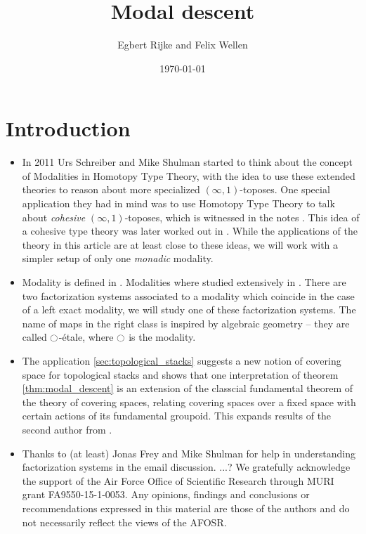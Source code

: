 \documentclass[9pt,twosided]{amsart}
\title{Modal descent}
\author{Egbert Rijke and Felix Wellen}
\date{\today}
\begin{document}
\maketitle

\section{Introduction}
\begin{itemize}
\item In 2011 Urs Schreiber and Mike Shulman started to think about the concept of Modalities in Homotopy Type Theory,
  with the idea to use these extended theories to reason about more specialized $(\infty,1)$-toposes.
  One special application they had in mind was to use Homotopy Type Theory to talk about \emph{cohesive} $(\infty,1)$-toposes,
  which is witnessed in the notes \cite{ShulmanSchreiber}.
  This idea of a cohesive type theory was later worked out in \cite{ShulmanRealCohesion}.
  While the applications of the theory in this article are at least close to these ideas,
  we will work with a simpler setup of only one \emph{monadic} modality.
\item Modality is defined in \cite[Section 7.7]{UFP}.
  Modalities where studied extensively in \cite{RijkeSpittersShulman}.
  There are two factorization systems associated to a modality which coincide in the case of a left exact modality,
  we will study one of these factorization systems. The name of maps in the right class is inspired by algebraic geometry -- they are called ${\ocircle}$-étale,
  where ${\ocircle}$ is the modality.
\item The application \ref{sec:topological_stacks} suggests a new notion of covering space for topological stacks and shows that
  one interpretation of theorem \ref{thm:modal_descent} is an extension of the classcial fundamental theorem of the theory of covering spaces,
  relating covering spaces over a fixed space with certain actions of its fundamental groupoid.
  This expands results of the second author from \cite{wellen-oxford-abstract}.
\item Thanks to (at least) Jonas Frey and Mike Shulman for help in understanding factorization systems in the email discussion.
  ...?
  We gratefully acknowledge the support of the Air Force Office of Scientific Research through MURI grant FA9550-15-1-0053. Any opinions, findings and conclusions or recommendations expressed in this material are those of the authors and do not necessarily reflect the views of the AFOSR.
\end{itemize}
\end{document}
